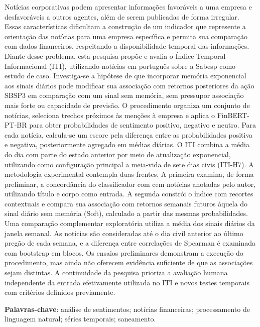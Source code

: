 \begin{resumo}

Notícias corporativas podem apresentar informações favoráveis a uma empresa e desfavoráveis a outros agentes, além de serem publicadas de forma irregular. Essas características dificultam a construção de um indicador que represente a orientação das notícias para uma empresa específica e permita sua comparação com dados financeiros, respeitando a disponibilidade temporal das informações. Diante desse problema, esta pesquisa propõe e avalia o Índice Temporal Informacional (ITI), utilizando notícias em português sobre a Sabesp como estudo de caso. Investiga-se a hipótese de que incorporar memória exponencial aos sinais diários pode modificar sua associação com retornos posteriores da ação SBSP3 em comparação com um sinal sem memória, sem pressupor associação mais forte ou capacidade de previsão. O procedimento organiza um conjunto de notícias, seleciona trechos próximos às menções à empresa e aplica o FinBERT-PT-BR para obter probabilidades de sentimento positivo, negativo e neutro. Para cada notícia, calcula-se um escore pela diferença entre as probabilidades positiva e negativa, posteriormente agregado em médias diárias. O ITI combina a média do dia com parte do estado anterior por meio de atualização exponencial, utilizando como configuração principal a meia-vida de sete dias civis (ITI-H7). A metodologia experimental contempla duas frentes. A primeira examina, de forma preliminar, a concordância do classificador com cem notícias anotadas pelo autor, utilizando título e corpo como entrada. A segunda constrói o índice com recortes contextuais e compara sua associação com retornos semanais futuros àquela do sinal diário sem memória (Soft), calculado a partir das mesmas probabilidades. Uma comparação complementar exploratória utiliza a média dos sinais diários da janela semanal. As notícias são consideradas até o dia civil anterior ao último pregão de cada semana, e a diferença entre correlações de Spearman é examinada com bootstrap em blocos. Os ensaios preliminares demonstram a execução do procedimento, mas ainda não oferecem evidência suficiente de que as associações sejam distintas. A continuidade da pesquisa prioriza a avaliação humana independente da entrada efetivamente utilizada no ITI e novos testes temporais com critérios definidos previamente.

\vspace{\onelineskip}

\noindent
\textbf{Palavras-chave}: análise de sentimentos; notícias financeiras; processamento de linguagem natural; séries temporais; saneamento.
\end{resumo}

